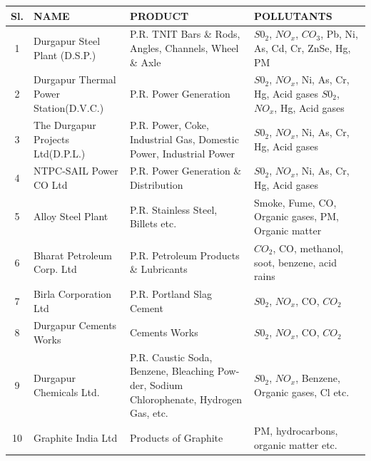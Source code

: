 \begin{center}
 \begin{tabular}{| c |  p{4cm} | p{4cm} | p{4cm}| } 
 \hline
 Sl. & NAME & PRODUCT & POLLUTANTS \\ [0.5ex] 
 \hline\hline
 1 & Durgapur Steel Plant (D.S.P.) & P.R. TNIT Bars \& Rods, Angles, Channels, Wheel \& Axle & $S0_2$, $NO_x$, $CO_3$, Pb, Ni, As, Cd, Cr, ZnSe, Hg, PM \\ 
 \hline
 2 & Durgapur Thermal Power Station(D.V.C.) & P.R. Power Generation & $S0_2$, $NO_x$, Ni, As, Cr, Hg, Acid gases $S0_2$, $NO_x$, Hg, Acid gases \\
 \hline
 3 & The Durgapur Projects Ltd(D.P.L.)  & P.R. Power, Coke, Industrial Gas, Domestic Power, Industrial Power & $S0_2$, $NO_x$, Ni, As, Cr, Hg, Acid gases \\
 \hline
 4 & NTPC-SAIL Power CO Ltd & P.R. Power Generation \& Distribution & $S0_2$, $NO_x$, Ni, As, Cr, Hg, Acid gases \\
 \hline
 5 & Alloy Steel Plant & P.R. Stainless Steel, Billets etc. & Smoke, Fume, CO, Organic 
gases, PM, Organic matter \\
 \hline
 6 & Bharat Petroleum Corp. Ltd  & P.R. Petroleum Products \& Lubricants & $CO_2$, CO, methanol, soot, benzene, acid rains \\
 \hline
 7 & Birla Corporation Ltd  & P.R. Portland Slag Cement & $S0_2$, $NO_x$, CO, $CO_2$ \\
\hline
 8 & Durgapur Cements Works  & Cements Works & $S0_2$, $NO_x$, CO, $CO_2$ \\ 
\hline
 9 & Durgapur Chemicals Ltd.  & P.R. Caustic Soda, Benzene, Bleaching Pow-der, Sodium Chlorophenate, Hydrogen Gas, etc. & $S0_2$, $NO_x$, Benzene, Organic gases, Cl etc. \\
\hline
 10 & Graphite India Ltd  &Products of Graphite & PM, hydrocarbons, organic matter etc. \\  [1ex] 
 \hline
\end{tabular}
\end{center}